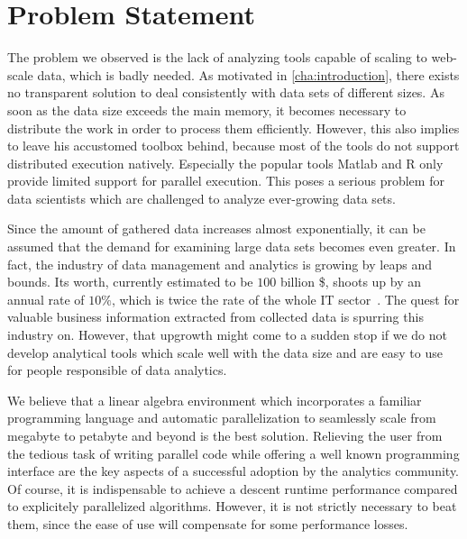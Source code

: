\chapter{Problem Statement}
\label{cha:problemstatement}


The problem we observed is the lack of analyzing tools capable of scaling to web-scale data, which is badly needed.
As motivated in \cref{cha:introduction}, there exists no transparent solution to deal consistently with data sets of different sizes.
As soon as the data size exceeds the main memory, it becomes necessary to distribute the work in order to process them efficiently.
However, this also implies to leave his accustomed toolbox behind, because most of the tools do not support distributed execution natively.
Especially the popular tools Matlab and R only provide limited support for parallel execution.
This poses a serious problem for data scientists which are challenged to analyze ever-growing data sets.

Since the amount of gathered data increases almost exponentially, it can be assumed that the demand for examining large data sets becomes even greater.
In fact, the industry of data management and analytics is growing by leaps and bounds.
Its worth, currently estimated to be $100$ billion \$, shoots up by an annual rate of $10\%$, which is twice the rate of the whole IT sector~\cite{economist}.
The quest for valuable business information extracted from collected data is spurring this industry on.
However, that upgrowth might come to a sudden stop if we do not develop analytical tools which scale well with the data size and are easy to use for people responsible of data analytics.

We believe that a linear algebra environment which incorporates a familiar programming language and automatic parallelization to seamlessly scale from megabyte to petabyte and beyond is the best solution.
Relieving the user from the tedious task of writing parallel code while offering a well known programming interface are the key aspects of a successful adoption by the analytics community.
Of course, it is indispensable to achieve a descent runtime performance compared to explicitely parallelized algorithms.
However, it is not strictly necessary to beat them, since the ease of use will compensate for some performance losses.

